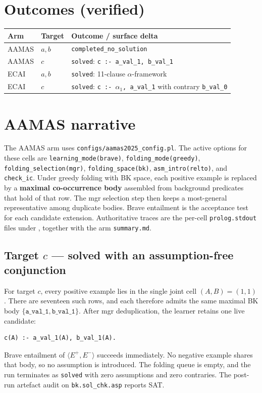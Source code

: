 \documentclass[11pt]{article}
\begin{document}
\section{Outcomes (verified)}

\begin{center}
\begin{tabular}{@{}lll@{}}
\toprule
Arm & Target & Outcome / surface delta \\
\midrule
AAMAS & \(a,b\) & \texttt{completed\_no\_solution} \\
AAMAS & \(c\) & \texttt{solved}: \texttt{c :- a\_val\_1, b\_val\_1} \\
ECAI & \(a,b\) & \texttt{solved}: 11-clause \(\alpha\)-framework \\
ECAI & \(c\) & \texttt{solved}:
  \texttt{c :- $\alpha_1$, a\_val\_1} with contrary \texttt{b\_val\_0} \\
\bottomrule
\end{tabular}
\end{center}

\section{AAMAS narrative}

{\raggedright
The AAMAS arm uses \texttt{configs/aamas2025\_config.pl}.
The active options for these cells are \texttt{learning\_mode(brave)},
\texttt{folding\_mode(greedy)}, \texttt{folding\_selection(mgr)},
\texttt{folding\_space(bk)}, \texttt{asm\_intro(relto)}, and \texttt{check\_ic}.
Under greedy folding with BK space, each positive example is replaced by a
\textbf{maximal co-occurrence body} assembled from background predicates that
hold of that row.
The mgr selection step then keeps a most-general representative among duplicate
bodies.
Brave entailment is the acceptance test for each candidate extension.
Authoritative traces are the per-cell \texttt{prolog.stdout} files under
, together
with the arm \texttt{summary.md}.
\par}

\subsection{Target \texorpdfstring{\(c\)}{c} --- solved with an assumption-free conjunction}

For target \(c\), every positive example lies in the single joint cell
\((A,B)=(1,1)\).
There are seventeen such rows, and each therefore admits the same maximal BK
body \(\{\mathtt{a\_val\_1},\mathtt{b\_val\_1}\}\).
After mgr deduplication, the learner retains one live candidate:
\begin{verbatim}
c(A) :- a_val_1(A), b_val_1(A).
\end{verbatim}
Brave entailment of \(\langle E^+,E^-\rangle\) succeeds immediately.
No negative example shares that body, so no assumption is introduced.
The folding queue is empty, and the run terminates as \texttt{solved} with zero
assumptions and zero contraries.
The post-run artefact audit on \texttt{bk.sol\_chk.asp} reports SAT.
\end{document}
